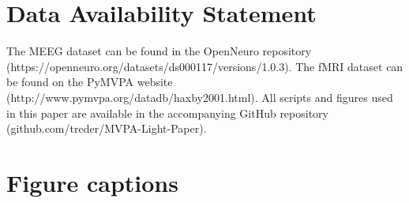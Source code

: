 \documentclass[utf8]{frontiersSCNS} %
\begin{document}
\section*{Data Availability Statement}
The MEEG dataset can be found in the OpenNeuro repository (https://openneuro.org/datasets/ds000117/versions/1.0.3). The fMRI dataset can be found on the PyMVPA website (http://www.pymvpa.org/datadb/haxby2001.html). All scripts and figures used in this paper are available in the accompanying GitHub repository (github.com/treder/MVPA-Light-Paper).




\section*{Figure captions}


\end{document}
